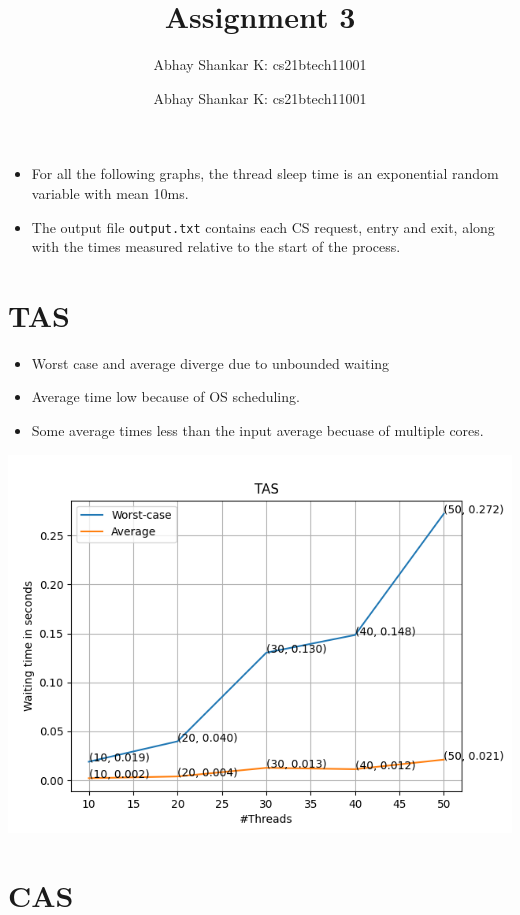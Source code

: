 \documentclass{amsart}
\author{Abhay Shankar K: cs21btech11001}
\newcommand{\me}{
    \author{Abhay Shankar K: cs21btech11001}
    \maketitle
}
\begin{document}
\title{Assignment 3}
\me

\begin{itemize}
    \item For all the following graphs, the thread sleep time is an exponential random variable with mean 10ms.
    \item The output file \texttt{output.txt} contains each CS request, entry and exit, along with the times measured relative to the start of the process.
\end{itemize}

\section{TAS} 

\begin{itemize}
    \item Worst case and average diverge due to unbounded waiting
    \item Average time low because of OS scheduling. 
    \item Some average times less than the input average becuase of multiple cores.
\end{itemize}
\centering
\includegraphics[scale = 0.75]{tas.png}

\newpage

\section{CAS} 
\end{document}
